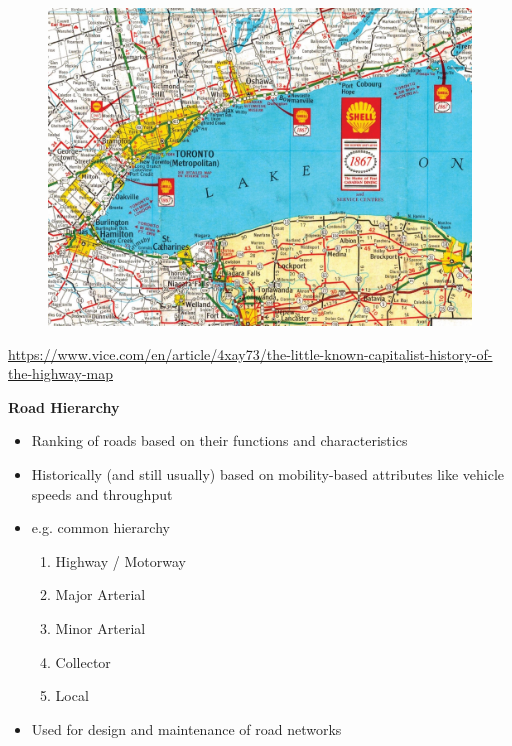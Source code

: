 \documentclass[aspectratio=169]{beamer}
\begin{document}
\begin{frame}
	
	\begin{figure}
		\centering
		\includegraphics[width=0.85\linewidth]{images/shell_map_ontario_1968.jpg}
		
	\end{figure}
	\tiny{\url{https://www.vice.com/en/article/4xay73/the-little-known-capitalist-history-of-the-highway-map}}
	
\end{frame}


\begin{frame}
	
	 \textbf{Road Hierarchy} \\
	 
	 \begin{itemize}
	 	\item Ranking of roads based on their functions and characteristics
	 	\item Historically (and still usually) based on mobility-based attributes like vehicle speeds and throughput
	 	\item  e.g. common hierarchy
	 	\begin{enumerate}
	 		\item Highway / Motorway
	 		\item Major Arterial
	 		\item Minor Arterial
	 		\item Collector
	 		\item Local
	 	\end{enumerate}
 		\item Used for design and maintenance of road networks
	 \end{itemize}
	 

	
\end{frame}
\end{document}

